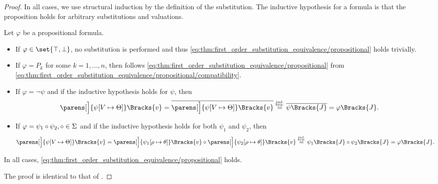\begin{proof}
  In all cases, we use structural induction by the definition of the substitution\IND. The inductive hypothesis for a formula is that the proposition holds for arbitrary substitutions and valuations.

   Let \( \varphi \) be a propositional formula.
  \begin{itemize}
    \item If \( \varphi \in \set{ \top, \bot } \), no substitution is performed and thus \eqref{eq:thm:first_order_substitution_equivalence/propositional} holds trivially.

    \item If \( \varphi = P_k \) for some \( k = 1, \ldots, n \), then follows \eqref{eq:thm:first_order_substitution_equivalence/propositional} from \eqref{eq:thm:first_order_substitution_equivalence/propositional/compatibility}.

    \item If \( \varphi = \neg \psi \) and if the inductive hypothesis holds for \( \psi \), then
    \begin{equation*}
      \parens[\Big]{ \psi[V \mapsto \Theta] }\Bracks{v}
      =
      \overline{\parens[\Big]{ \psi[V \mapsto \Theta] }\Bracks{v}}
      \overset {\IndHyp} =
      \overline{\psi \Bracks{J}}
      =
      \varphi \Bracks{J}.
    \end{equation*}

    \item If \( \varphi = \psi_1 \mathbin {\circ} \psi_2, \mathbin {\circ} \in \Sigma \) and if the inductive hypothesis holds for both \( \psi_1 \) and \( \psi_2 \), then
    \begin{equation*}
      \parens[\Big]{ \psi[V \mapsto \Theta] }\Bracks{v}
      =
      \parens[\Big]{ \psi_1[\rho \mapsto \theta] }\Bracks{v} \bincirc \parens[\Big]{ \psi_2[\rho \mapsto \theta] }\Bracks{v}
      \overset {\IndHyp} =
      \psi_1 \Bracks{J} \bincirc \psi_2\Bracks{J}
      =
      \varphi\Bracks{J}.
    \end{equation*}
  \end{itemize}

  In all cases, \eqref{eq:thm:first_order_substitution_equivalence/propositional} holds.

   The proof is identical to that of .


\end{proof}
